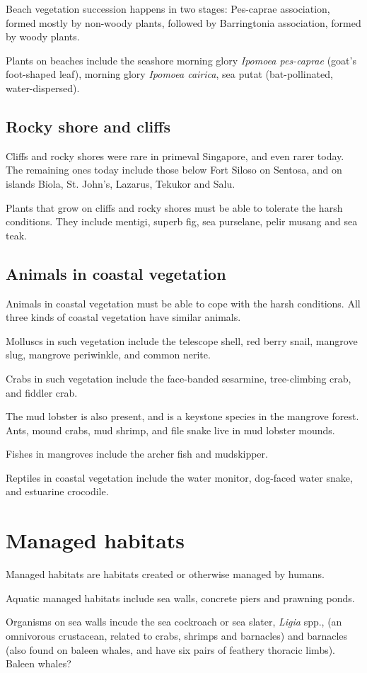 \documentclass{slnotes}
\newcommand{\scn}[1]{\textit{#1}}
\begin{document}
Beach vegetation succession happens in two stages: Pes-caprae association, formed mostly by non-woody plants, followed by Barringtonia association, formed by woody plants.

Plants on beaches include the seashore morning glory \scn{Ipomoea pes-caprae} (goat's foot-shaped leaf), morning glory \scn{Ipomoea cairica}, sea putat (bat-pollinated, water-dispersed).
\section{Rocky shore and cliffs}
Cliffs and rocky shores were rare in primeval Singapore, and even rarer today. The remaining ones today include those below Fort Siloso on Sentosa, and on islands Biola, St. John's, Lazarus, Tekukor and Salu.

Plants that grow on cliffs and rocky shores must be able to tolerate the harsh conditions. They include mentigi, superb fig, sea purselane, pelir musang and sea teak.
\section{Animals in coastal vegetation}
Animals in coastal vegetation must be able to cope with the harsh conditions. All three kinds of coastal vegetation have similar animals.

Molluscs in such vegetation include the telescope shell, red berry snail, mangrove slug, mangrove periwinkle, and common nerite.

Crabs in such vegetation include the face-banded sesarmine, tree-climbing crab, and fiddler crab.

The mud lobster is also present, and is a keystone species in the mangrove forest. Ants, mound crabs, mud shrimp, and file snake live in mud lobster mounds.

Fishes in mangroves include the archer fish and mudskipper.

Reptiles in coastal vegetation include the water monitor, dog-faced water snake, and estuarine crocodile.
\chapter{Managed habitats}
Managed habitats are habitats created or otherwise managed by humans.

Aquatic managed habitats include sea walls, concrete piers and prawning ponds.

Organisms on sea walls incude the sea cockroach or sea slater, \scn{Ligia} spp., (an omnivorous crustacean, related to crabs, shrimps and barnacles) and barnacles (also found on baleen whales, and have six pairs of feathery thoracic limbs). Baleen whales?
\end{document}
